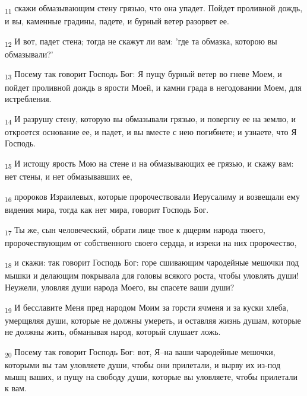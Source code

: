 \begin{tcolorbox}
\textsubscript{11} скажи обмазывающим стену грязью, что она упадет. Пойдет проливной дождь, и вы, каменные градины, падете, и бурный ветер разорвет ее.
\end{tcolorbox}
\begin{tcolorbox}
\textsubscript{12} И вот, падет стена; тогда не скажут ли вам: 'где та обмазка, которою вы обмазывали?'
\end{tcolorbox}
\begin{tcolorbox}
\textsubscript{13} Посему так говорит Господь Бог: Я пущу бурный ветер во гневе Моем, и пойдет проливной дождь в ярости Моей, и камни града в негодовании Моем, для истребления.
\end{tcolorbox}
\begin{tcolorbox}
\textsubscript{14} И разрушу стену, которую вы обмазывали грязью, и повергну ее на землю, и откроется основание ее, и падет, и вы вместе с нею погибнете; и узнаете, что Я Господь.
\end{tcolorbox}
\begin{tcolorbox}
\textsubscript{15} И истощу ярость Мою на стене и на обмазывающих ее грязью, и скажу вам: нет стены, и нет обмазывавших ее,
\end{tcolorbox}
\begin{tcolorbox}
\textsubscript{16} пророков Израилевых, которые пророчествовали Иерусалиму и возвещали ему видения мира, тогда как нет мира, говорит Господь Бог.
\end{tcolorbox}
\begin{tcolorbox}
\textsubscript{17} Ты же, сын человеческий, обрати лице твое к дщерям народа твоего, пророчествующим от собственного своего сердца, и изреки на них пророчество,
\end{tcolorbox}
\begin{tcolorbox}
\textsubscript{18} и скажи: так говорит Господь Бог: горе сшивающим чародейные мешочки под мышки и делающим покрывала для головы всякого роста, чтобы уловлять души! Неужели, уловляя души народа Моего, вы спасете ваши души?
\end{tcolorbox}
\begin{tcolorbox}
\textsubscript{19} И бесславите Меня пред народом Моим за горсти ячменя и за куски хлеба, умерщвляя души, которые не должны умереть, и оставляя жизнь душам, которые не должны жить, обманывая народ, который слушает ложь.
\end{tcolorbox}
\begin{tcolorbox}
\textsubscript{20} Посему так говорит Господь Бог: вот, Я--на ваши чародейные мешочки, которыми вы там уловляете души, чтобы они прилетали, и вырву их из-под мышц ваших, и пущу на свободу души, которые вы уловляете, чтобы прилетали к вам.
\end{tcolorbox}
